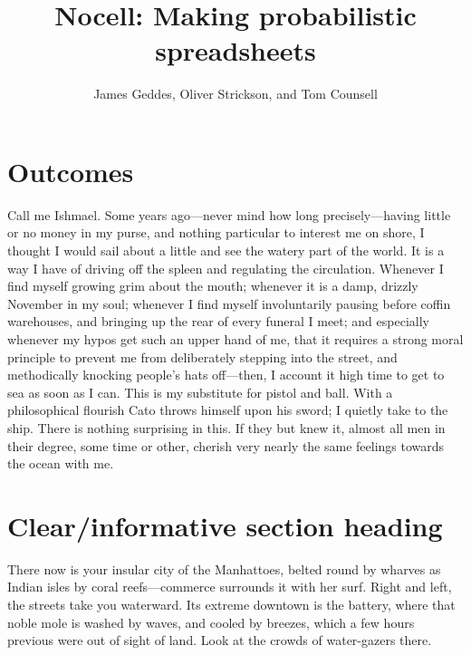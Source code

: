 \documentclass[a4paper, twocolumn, 12pt]{article}
\title{Nocell: Making probabilistic spreadsheets}
\author{James Geddes, Oliver Strickson, and Tom Counsell}
\date{}
\newlength{\gridv}\setlength{\gridv}{0.11111111111111111\paperheight}
\newlength{\gridh}\setlength{\gridh}{0.04761904761904762\paperwidth}
\begin{document}
\maketitle
\thispagestyle{empty}
\section*{Outcomes}
Call me Ishmael. Some years ago—never mind how long precisely—having little or
no money in my purse, and nothing particular to interest me on shore, I thought
I would sail about a little and see the watery part of the world. It is a way I
have of driving off the spleen and regulating the circulation. Whenever I find
myself growing grim about the mouth; whenever it is a damp, drizzly November in
my soul; whenever I find myself involuntarily pausing before coffin warehouses,
and bringing up the rear of every funeral I meet; and especially whenever my
hypos get such an upper hand of me, that it requires a strong moral principle to
prevent me from deliberately stepping into the street, and methodically knocking
people’s hats off—then, I account it high time to get to sea as soon as I
can. This is my substitute for pistol and ball. With a philosophical flourish
Cato throws himself upon his sword; I quietly take to the ship. There is nothing
surprising in this. If they but knew it, almost all men in their degree, some
time or other, cherish very nearly the same feelings towards the ocean with me.

\section*{Clear/informative section heading}
There now is your insular city of the Manhattoes, belted round by wharves as
Indian isles by coral reefs—commerce surrounds it with her surf. Right and left,
the streets take you waterward. Its extreme downtown is the battery, where that
noble mole is washed by waves, and cooled by breezes, which a few hours previous
were out of sight of land. Look at the crowds of water-gazers there.
\end{document}
